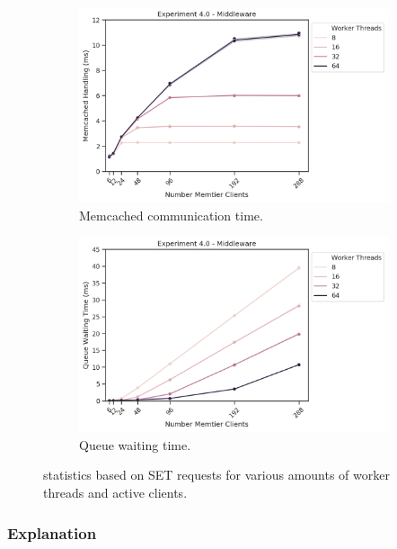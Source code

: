 \begin{figure}
{\begin{subfigure}[t!]{0.55\textwidth}
                    \includegraphics[width=1\textwidth]{../data_analysis/figures/4-0_mw_mc-comm-time.png}
                    \caption{Memcached communication time.\label{fig:sets_mw_mct}}
                \end{subfigure}
                \begin{subfigure}[t!]{0.55\textwidth}
                    \centering
                    \includegraphics[width=1\textwidth]{../data_analysis/figures/4-0_mw_queue-wait-time.png}
                    \caption{Queue waiting time.\label{fig:sets_mw_qwt}}
                \end{subfigure}
            }
            \caption{\mw{} statistics based on SET requests for various amounts of worker threads and active
                     clients.\label{fig:mw_sets_sll}}
        \end{figure}

        \subsubsection{Explanation\label{subsubsec:4_full-system_explanation}}

